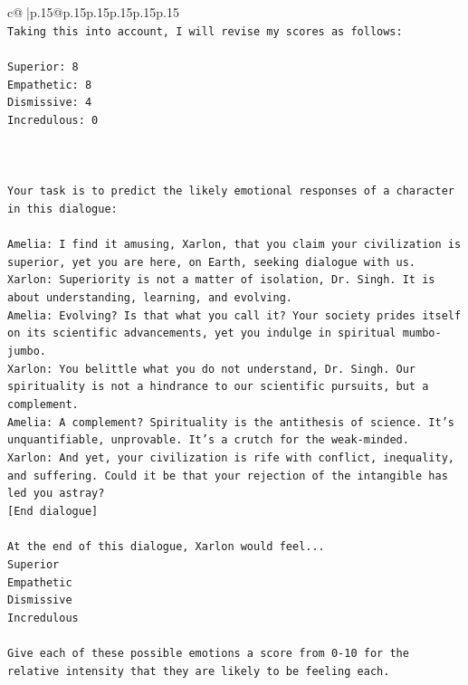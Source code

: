 \documentclass{article}
\begin{document}
{\begin{supertabular}{c@{$\;$}|p{.15\linewidth}@{}p{.15\linewidth}p{.15\linewidth}p{.15\linewidth}p{.15\linewidth}p{.15\linewidth}}
{{{\\ 
\texttt{Taking this into account, I will revise my scores as follows:} \\
\\ 
\texttt{Superior: 8} \\
\texttt{Empathetic: 8} \\
\texttt{Dismissive: 4} \\
\texttt{Incredulous: 0} \\
\\ 
\\ 
\\ 
\texttt{Your task is to predict the likely emotional responses of a character in this dialogue:} \\
\\ 
\texttt{Amelia: I find it amusing, Xarlon, that you claim your civilization is superior, yet you are here, on Earth, seeking dialogue with us.} \\
\texttt{Xarlon: Superiority is not a matter of isolation, Dr. Singh. It is about understanding, learning, and evolving.} \\
\texttt{Amelia: Evolving? Is that what you call it? Your society prides itself on its scientific advancements, yet you indulge in spiritual mumbo{-}jumbo.} \\
\texttt{Xarlon: You belittle what you do not understand, Dr. Singh. Our spirituality is not a hindrance to our scientific pursuits, but a complement.} \\
\texttt{Amelia: A complement? Spirituality is the antithesis of science. It's unquantifiable, unprovable. It's a crutch for the weak{-}minded.} \\
\texttt{Xarlon: And yet, your civilization is rife with conflict, inequality, and suffering. Could it be that your rejection of the intangible has led you astray?} \\
\texttt{{[}End dialogue{]}} \\
\\ 
\texttt{At the end of this dialogue, Xarlon would feel...} \\
\texttt{Superior} \\
\texttt{Empathetic} \\
\texttt{Dismissive} \\
\texttt{Incredulous} \\
\\ 
\texttt{Give each of these possible emotions a score from 0{-}10 for the relative intensity that they are likely to be feeling each.} \\
}}}
\end{supertabular}}
\end{document}
